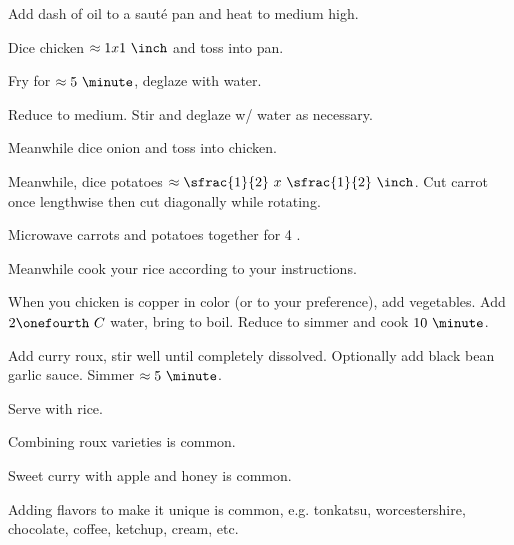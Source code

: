 \begin{preparation}
\item Add dash of oil to a saut\'{e} pan and heat to medium high.

\item Dice chicken $\approx1x1~\inch$ and toss into pan.

\item Fry for $\approx 5~\minute$, deglaze with water.

\item Reduce to medium.
    Stir and deglaze w/ water as necessary.

\item Meanwhile dice onion and toss into chicken.

\item Meanwhile, dice potatoes $\approx \sfrac{1}{2}~x~\sfrac{1}{2}~\inch$.
    Cut carrot once lengthwise then cut diagonally while rotating.

\item Microwave carrots and potatoes together for 4 \minute.

\item Meanwhile cook your rice according to your instructions.

\item When you chicken is copper in color (or to your preference), add vegetables.
    Add $2 \onefourth~C$ water, bring to boil.
    Reduce to simmer and cook $10~\minute$.

\item Add curry roux, stir well until completely dissolved.
    Optionally add black bean garlic sauce.
    Simmer $\approx5~\minute$.

\item Serve with rice.
\end{preparation}

\begin{variation}
\item Combining roux varieties is common.

\item Sweet curry with apple and honey is common.

\item Adding flavors to make it unique is common, e.g. tonkatsu,
    worcestershire, chocolate, coffee, ketchup, cream, etc.
\end{variation}

\recipeend
